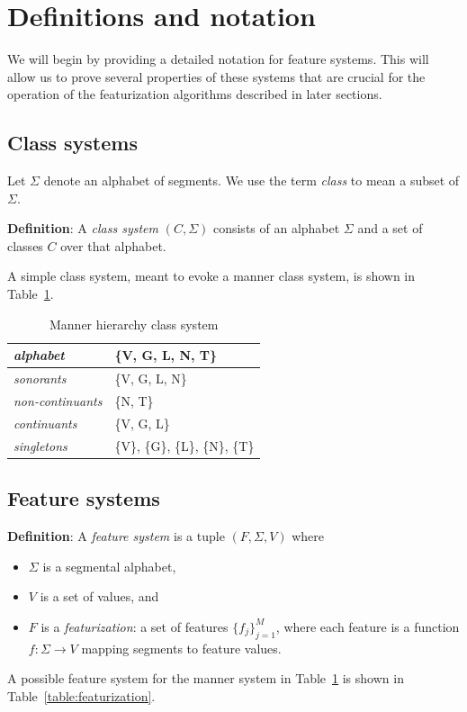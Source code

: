 \documentclass[12pt, oneside]{article}   	%
\begin{document}
\FloatBarrier
\section{Definitions and notation}
\label{sec:definitions}
We will begin by providing a detailed notation for feature systems. This will allow us to prove several properties of these systems that are crucial for the operation of the featurization algorithms described in later sections.

\subsection{Class systems}

Let $\Sigma$ denote an alphabet of segments. We use the term \textit{class} to mean a subset of $\Sigma$. 

\vspace{0.5\baselineskip} \noindent \textbf{Definition}: A \textit{class system} $(C, \Sigma)$ consists of an alphabet $\Sigma$ and a set of classes $C$ over that alphabet. 

\vspace{0.5\baselineskip}  \noindent A simple class system, meant to evoke a manner class system, is shown in Table~\ref{table:manner_system}.

\begin{table}[htb!]
	\centering
	\begin{tabular}{|l|l|}
		\hline
		\textit{alphabet} & \{V, G, L, N, T\} \\
		\hline
		\textit{sonorants} & \{V, G, L, N\} \\
		\hline
		\textit{non-continuants} & \{N, T\} \\
		\hline
		\textit{continuants} & \{V, G, L\} \\
		\hline
		\textit{singletons} & \{V\}, \{G\}, \{L\}, \{N\}, \{T\} \\
		\hline
	\end{tabular}
	\caption{Manner hierarchy class system}
	\label{table:manner_system}
\end{table}

\subsection{Feature systems}

\textbf{Definition}: A \textit{feature system} is a tuple $(F, \Sigma, V)$ where
\begin{itemize}
    \item $\Sigma$ is a segmental alphabet, 
    \item $V$ is a set of values, and 
    \item $F$ is a \textit{featurization}: a set of features $\{f_j\}_{j=1}^M$, where each feature is a function $f: \Sigma \rightarrow V$ mapping segments to feature values.
\end{itemize}
A possible feature system for the manner system in Table~\ref{table:manner_system} is shown in Table~\ref{table:featurization}.
\end{document}
